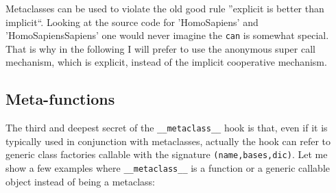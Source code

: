 \documentclass[10pt,english]{article}
\begin{document}
Metaclasses can be used to violate the old good rule ''explicit is
better than implicit``. Looking at the source code for 'HomoSapiens'
and 'HomoSapiensSapiens' one would never imagine the \texttt{can} is
somewhat special. That is why in the following I will prefer to
use the anonymous super call mechanism, which is explicit, instead
of the implicit cooperative mechanism.



\hypertarget{meta-functions}{}
\subsection*{Meta-functions}

The third and deepest secret of the \texttt{{\_}{\_}metaclass{\_}{\_}} hook is that, even if
it is typically used in conjunction with metaclasses, actually the hook 
can refer to generic class factories callable with the signature
\texttt{(name,bases,dic)}. Let me show a few examples 
where \texttt{{\_}{\_}metaclass{\_}{\_}} is a function or a generic callable object
instead of being a metaclass:
\end{document}

